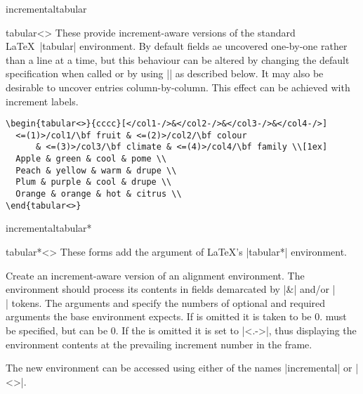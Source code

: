 \documentclass[a4paper]{ltxdoc}
\begin{document}
\begin{environment}{{incrementaltabular}}
\end{environment}
\begin{environment}{{tabular<>}}
  These provide increment-aware versions of the standard \LaTeX\ |tabular|
  environment.  By default  fields ae uncovered one-by-one rather than a line at
  a time, but this behaviour can be altered by changing the default
  specification when called or by using |\setincrementalenvspec| as described
  below.  It may also be desirable to uncover entries column-by-column.  This
  effect can be achieved with increment labels.
\example
\begin{verbatim}
\begin{tabular<>}{cccc}[</col1-/>&</col2-/>&</col3-/>&</col4-/>]
  <=(1)>/col1/\bf fruit & <=(2)>/col2/\bf colour  
      & <=(3)>/col3/\bf climate & <=(4)>/col4/\bf family \\[1ex]
  Apple & green & cool & pome \\
  Peach & yellow & warm & drupe \\
  Plum & purple & cool & drupe \\
  Orange & orange & hot & citrus \\
\end{tabular<>}  
\end{verbatim}
\end{environment}

\begin{environment}{{incrementaltabular*}}
\end{environment}
\begin{environment}{{tabular*<>}}
  These forms add the  argument of \LaTeX's |tabular*| environment.
\end{environment}


\begin{command}{{\CreateIncrementalAlignmentEnvironment}}
  Create an increment-aware version of an alignment environment.  The 
  environment should process its contents in fields demarcated by |&| and/or
  |\\| tokens.  The arguments  and  specify the
  numbers of optional and required arguments the base environment expects.  If
   is omitted it is taken to be 0.   must be
  specified, but can be 0.  If the  is omitted it is
  set to |<.->|, thus displaying the environment contents at the prevailing
  increment number in the frame.

  The new environment can be accessed using either of the names
  |incremental| or |<>|.
\end{command}
\end{document}
